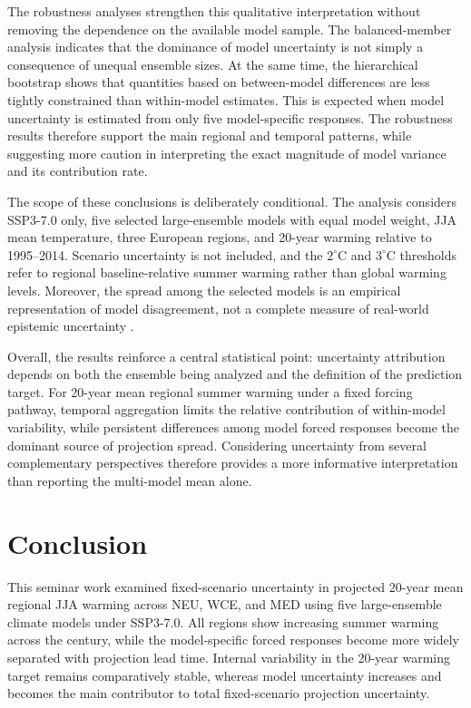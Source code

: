 \documentclass[
]{krantz}
\begin{document}
The robustness analyses strengthen this qualitative interpretation without removing the dependence on the available model sample. The balanced-member analysis indicates that the dominance of model uncertainty is not simply a consequence of unequal ensemble sizes. At the same time, the hierarchical bootstrap shows that quantities based on between-model differences are less tightly constrained than within-model estimates. This is expected when model uncertainty is estimated from only five model-specific responses. The robustness results therefore support the main regional and temporal patterns, while suggesting more caution in interpreting the exact magnitude of model variance and its contribution rate.

The scope of these conclusions is deliberately conditional. The analysis considers SSP3-7.0 only, five selected large-ensemble models with equal model weight, JJA mean temperature, three European regions, and 20-year warming relative to 1995--2014. Scenario uncertainty is not included, and the \(2^\circ\mathrm{C}\) and \(3^\circ\mathrm{C}\) thresholds refer to regional baseline-relative summer warming rather than global warming levels. Moreover, the spread among the selected models is an empirical representation of model disagreement, not a complete measure of real-world epistemic uncertainty \citep{Gruber2025}.

Overall, the results reinforce a central statistical point: uncertainty attribution depends on both the ensemble being analyzed and the definition of the prediction target. For 20-year mean regional summer warming under a fixed forcing pathway, temporal aggregation limits the relative contribution of within-model variability, while persistent differences among model forced responses become the dominant source of projection spread. Considering uncertainty from several complementary perspectives therefore provides a more informative interpretation than reporting the multi-model mean alone.

\section{Conclusion}\label{conclusion-4}

This seminar work examined fixed-scenario uncertainty in projected 20-year mean regional JJA warming across NEU, WCE, and MED using five large-ensemble climate models under SSP3-7.0. All regions show increasing summer warming across the century, while the model-specific forced responses become more widely separated with projection lead time. Internal variability in the 20-year warming target remains comparatively stable, whereas model uncertainty increases and becomes the main contributor to total fixed-scenario projection uncertainty.
\end{document}
